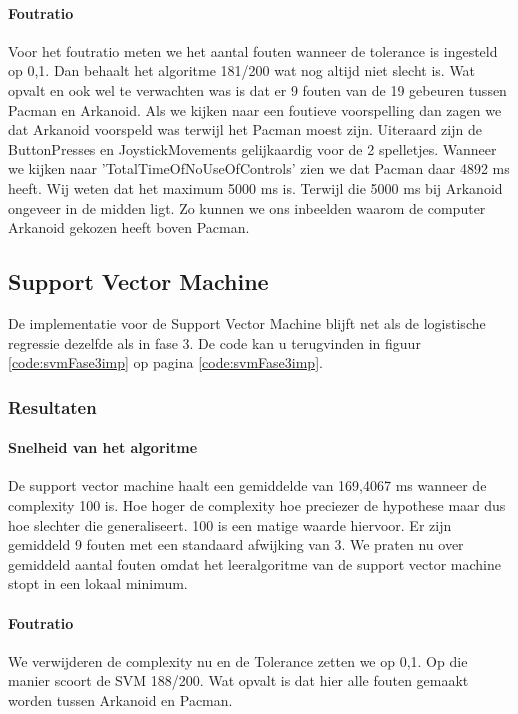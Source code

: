 \paragraph{Foutratio} 
Voor het foutratio meten we het aantal fouten wanneer de tolerance is ingesteld op 0,1. Dan behaalt het algoritme 181/200 wat nog altijd niet slecht is. Wat opvalt en ook wel te verwachten was is dat er 9 fouten van de 19 gebeuren tussen Pacman en Arkanoid. Als we kijken naar een foutieve voorspelling dan zagen we dat Arkanoid voorspeld was terwijl het Pacman moest zijn. Uiteraard zijn de ButtonPresses en JoystickMovements gelijkaardig voor de 2 spelletjes. Wanneer we kijken naar 'TotalTimeOfNoUseOfControls' zien we dat Pacman daar 4892 ms heeft. Wij weten dat het maximum 5000 ms is. Terwijl die 5000 ms bij Arkanoid ongeveer in de midden ligt. Zo kunnen we ons inbeelden waarom de computer Arkanoid gekozen heeft boven Pacman. 

\newpage
\subsection{Support Vector Machine}
\label{sec:supportvectormachineFase4}
De implementatie voor de Support Vector Machine blijft net als de logistische regressie dezelfde als in fase 3. De code kan u terugvinden in figuur \ref{code:svmFase3imp} op pagina \ref{code:svmFase3imp}.

\subsubsection{Resultaten}
\paragraph{Snelheid van het algoritme} 
De support vector machine haalt een gemiddelde van 169,4067 ms wanneer de complexity 100 is. Hoe hoger de complexity hoe preciezer de hypothese maar dus hoe slechter die generaliseert. 100 is een matige waarde hiervoor. Er zijn gemiddeld 9 fouten met een standaard afwijking van 3. We praten nu over gemiddeld aantal fouten omdat het leeralgoritme van de support vector machine stopt in een lokaal minimum.

\paragraph{Foutratio}
We verwijderen de complexity nu en de Tolerance zetten we op 0,1. Op die manier scoort de SVM 188/200. Wat opvalt is dat hier alle fouten gemaakt worden tussen Arkanoid en Pacman. 

